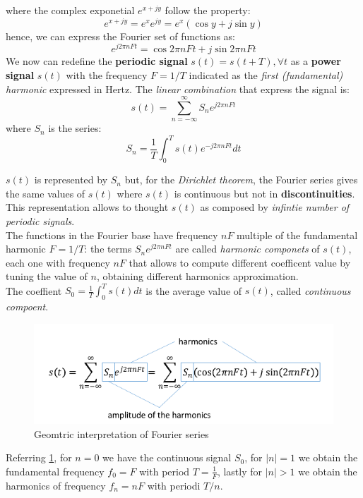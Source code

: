 \documentclass[10pt,a4paper]{report}
\theoremstyle{definition}
\begin{document}
where the complex exponetial $e^{x+jy}$ follow the property:
\begin{equation}
	e^{x+jy} = e^{x}e^{jy} = e^{x}(\cos{y} + j\sin{y})
\end{equation}
hence, we can express the Fourier set of functions as:
\begin{equation}
	e^{j2\pi nFt} = \cos{2\pi nFt} + j\sin{2\pi n Ft}
\end{equation}
We now can redefine the \textbf{periodic signal} $s(t) = s(t+T),  \forall t$ as a \textbf{power signal} $s(t)$ with the frequency $F = 1/T$ indicated as the \textit{first (fundamental) harmonic} expressed in Hertz.
The \textit{linear combination} that express the signal is:
\begin{equation}
	s(t) = \sum_{n=-\infty}^{\infty}S_{n}e^{j2\pi n Ft} 
\end{equation}
where $S_{n}$ is the series:
\begin{equation}
	S_{n} = \frac{1}{T} \int_{0}^{T} s(t)e^{-j2\pi nFt} dt
\end{equation}

$s(t)$ is represented by $S_{n}$ but, for the \textit{Dirichlet theorem}, the Fourier series gives the same values of $s(t)$ where $s(t)$ is continuous but not in \textbf{discontinuities}. This representation allows to thought $s(t)$ as composed by \textit{infintie number of periodic signals}. \\
The functions in the Fourier base have frequency $nF$ multiple of the fundamental harmonic $F=1/T$: the terms $S_{n}e^{j2\pi nFt}$ are called \textit{harmonic componets} of $s(t)$, each one with frequency $nF$ that allows to compute different coefficent value by tuning the value of $n$, obtaining different harmonics approximation.\\
The coeffient $S_{0} = \frac{1}{T}\int_{0}^{T}s(t)dt$ is the average value of $s(t)$, called \textit{continuous compoent}. 


\begin{figure}[h]
	\centering\includegraphics[scale=0.50]{images/Pasted image 20230511102243.png}
	\caption{Geomtric interpretation of Fourier series}
	\label{geometric-complex-fourier}
	
\end{figure}
Referring \ref{geometric-complex-fourier}, for $n=0$ we have the continuous signal $S_{0}$, for $|n|=1$ we obtain the fundamental frequency $f_{0} = F$ with period $T=\frac{1}{F}$, lastly for $|n| > 1$ we obtain the harmonics of frequency $f_{n} = nF$ with periodi $T/n$.
\end{document}
